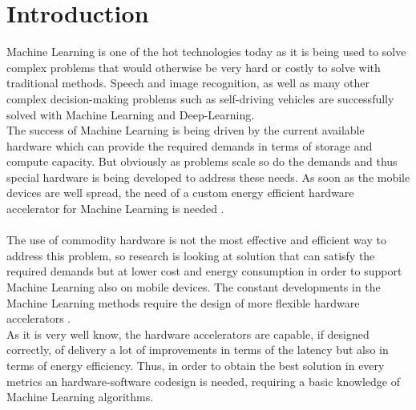 \chapter{Introduction}

Machine Learning is one of the hot technologies today as it is being used to solve complex problems that would otherwise be very hard or costly to solve with traditional methods. Speech and image recognition, as well as many other complex decision-making problems such as self-driving vehicles are successfully solved with Machine Learning and Deep-Learning. \\
The success of Machine Learning is being driven by the current available hardware which can provide the required demands in terms of storage and compute capacity. But obviously as problems scale so do the demands and thus special hardware is being developed to address these needs. As soon as the mobile devices are well spread, the need of a custom energy efficient hardware accelerator
for Machine Learning is needed \cite{paper:2}.\\\\
The use of commodity hardware is not the most effective and efficient way to address this problem, so research is looking at solution that can satisfy the required demands but at lower cost and energy consumption in order to support Machine Learning also on mobile devices. 
The constant developments in the Machine Learning  methods require the design of more flexible hardware accelerators \cite{paper:1} \cite{paper:2} .\\
As it is very well know, the hardware accelerators are capable, if designed correctly, of delivery a lot of improvements in terms of the latency but also in terms of energy efficiency\cite{paper:29}. Thus, in order to obtain the best solution in every metrics an hardware-software codesign is needed, requiring a basic knowledge of Machine Learning algorithms.\\\\

